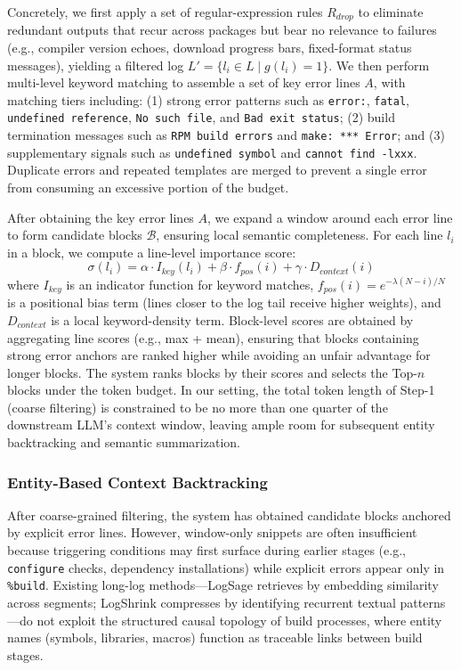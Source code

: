 \documentclass[sigconf,anonymous]{acmart}
\begin{document}
Concretely, we first apply a set of regular-expression rules $R_{drop}$ to eliminate redundant outputs that recur across packages but bear no relevance to failures (e.g., compiler version echoes, download progress bars, fixed-format status messages), yielding a filtered log $L' = \{l_i \in L \mid g(l_i) = 1\}$. We then perform multi-level keyword matching to assemble a set of key error lines $A$, with matching tiers including: (1) strong error patterns such as \texttt{error:}, \texttt{fatal}, \texttt{undefined reference}, \texttt{No such file}, and \texttt{Bad exit status}; (2) build termination messages such as \texttt{RPM build errors} and \texttt{make: *** Error}; and (3) supplementary signals such as \texttt{undefined symbol} and \texttt{cannot find -lxxx}. Duplicate errors and repeated templates are merged to prevent a single error from consuming an excessive portion of the budget.

After obtaining the key error lines $A$, we expand a window around each error line to form candidate blocks $\mathcal{B}$, ensuring local semantic completeness. For each line $l_i$ in a block, we compute a line-level importance score:
\begin{equation}
\sigma(l_i) = \alpha \cdot I_{key}(l_i) + \beta \cdot f_{pos}(i) + \gamma \cdot D_{context}(i)
\end{equation}
where $I_{key}$ is an indicator function for keyword matches, $f_{pos}(i) = e^{-\lambda(N-i)/N}$ is a positional bias term (lines closer to the log tail receive higher weights), and $D_{context}$ is a local keyword-density term. Block-level scores are obtained by aggregating line scores (e.g., max + mean), ensuring that blocks containing strong error anchors are ranked higher while avoiding an unfair advantage for longer blocks. The system ranks blocks by their scores and selects the Top-$n$ blocks under the token budget. In our setting, the total token length of Step-1 (coarse filtering) is constrained to be no more than one quarter of the downstream LLM's context window, leaving ample room for subsequent entity backtracking and semantic summarization.

\subsubsection{Entity-Based Context Backtracking}

After coarse-grained filtering, the system has obtained candidate blocks anchored by explicit error lines. However, window-only snippets are often insufficient because triggering conditions may first surface during earlier stages (e.g., \texttt{configure} checks, dependency installations) while explicit errors appear only in \texttt{\%build}. Existing long-log methods---LogSage retrieves by embedding similarity across segments; LogShrink compresses by identifying recurrent textual patterns---do not exploit the structured causal topology of build processes, where entity names (symbols, libraries, macros) function as traceable links between build stages.
\end{document}
